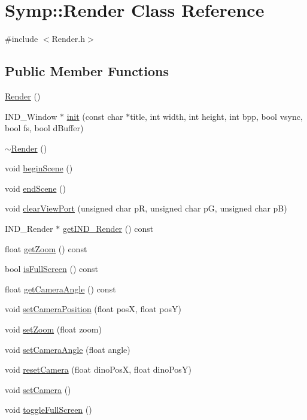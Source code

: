 \hypertarget{class_symp_1_1_render}{\section{Symp\-:\-:Render Class Reference}
\label{class_symp_1_1_render}
}


{\ttfamily \#include $<$Render.\-h$>$}

\subsection*{Public Member Functions}
\begin{DoxyCompactItemize}
\item 
\hyperlink{class_symp_1_1_render_a4505792fcfee84c6c94b87f3f5779891}{Render} ()
\item 
I\-N\-D\-\_\-\-Window $\ast$ \hyperlink{class_symp_1_1_render_a9b258118ee8e8dafb6668de699ee0402}{init} (const char $\ast$title, int width, int height, int bpp, bool vsync, bool fs, bool d\-Buffer)
\item 
\hyperlink{class_symp_1_1_render_a86c29b1e0beccbc1a7c83717dac38a44}{$\sim$\-Render} ()
\item 
void \hyperlink{class_symp_1_1_render_aa94659e2d71c3fccfde9f5fdd9bbfe29}{begin\-Scene} ()
\item 
void \hyperlink{class_symp_1_1_render_a750acc68c58537a7f6d73ba750719713}{end\-Scene} ()
\item 
void \hyperlink{class_symp_1_1_render_a96aff84eb780881d2a389d3f13841955}{clear\-View\-Port} (unsigned char p\-R, unsigned char p\-G, unsigned char p\-B)
\item 
I\-N\-D\-\_\-\-Render $\ast$ \hyperlink{class_symp_1_1_render_a393d266b34a1fcf4ef2912d9d7658147}{get\-I\-N\-D\-\_\-\-Render} () const 
\item 
float \hyperlink{class_symp_1_1_render_a6a0ecd56872f64dfa2417a9194c75f1f}{get\-Zoom} () const 
\item 
bool \hyperlink{class_symp_1_1_render_aa08df7e32f8115a4ec5e616a60a6615e}{is\-Full\-Screen} () const 
\item 
float \hyperlink{class_symp_1_1_render_a572084595ab2928bd5ed456ee3ffffea}{get\-Camera\-Angle} () const 
\item 
void \hyperlink{class_symp_1_1_render_aac4ba9ac09f2478851c7859744af121d}{set\-Camera\-Position} (float pos\-X, float pos\-Y)
\item 
void \hyperlink{class_symp_1_1_render_a8f5b9ca7ff4d32efbc933bcc8cadbc55}{set\-Zoom} (float zoom)
\item 
void \hyperlink{class_symp_1_1_render_a9e51c417fc122dd82f2be670f85373c9}{set\-Camera\-Angle} (float angle)
\item 
void \hyperlink{class_symp_1_1_render_ae134663e4d5709af44c76252d2abceed}{reset\-Camera} (float dino\-Pos\-X, float dino\-Pos\-Y)
\item 
void \hyperlink{class_symp_1_1_render_a8a4aed45f564547272e009aa53b10927}{set\-Camera} ()
\item 
void \hyperlink{class_symp_1_1_render_a9545ec8794a0b04ab3a1cc38c1b22d92}{toggle\-Full\-Screen} ()
\end{DoxyCompactItemize}


